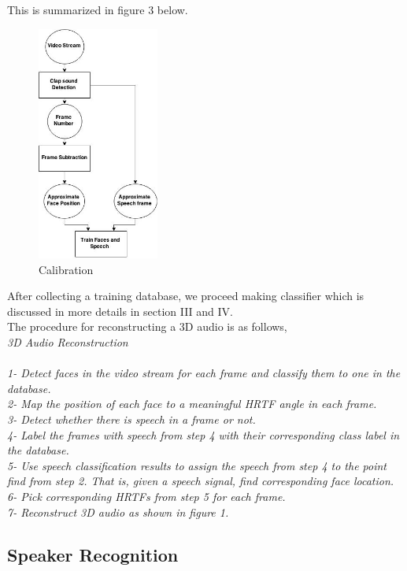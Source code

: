 \documentclass{article}
\begin{document}
This is summarized in figure 3 below. 
\begin{figure}[htb]
\begin{minipage}[b]{0.88\linewidth}
\centering
\centerline{\includegraphics[width=4.0cm]{calibration.jpg}}
\end{minipage}
\caption{Calibration}
\label{fig:res}
\end{figure}
\centerline{}

After collecting a training database, we proceed making classifier which is discussed in more details in section III and IV. \\ The procedure for reconstructing a 3D audio is as follows, \\

{\it 3D Audio Reconstruction \\ \\
1- Detect faces in the video stream for each frame and classify them to one in the database. \\
2- Map the position of each face to a meaningful HRTF angle in each frame. \\ 
3- Detect whether there is speech in a frame or not. \\
4- Label the frames with speech from step 4 with their corresponding class label in the database. \\
5- Use speech classification results to assign the speech from step 4 to the point find from step 2. That is, given a speech signal, find corresponding face location. \\
6- Pick corresponding HRTFs from step 5 for each frame. \\
7- Reconstruct 3D audio as shown in figure 1. }

\subsection{Speaker Recognition}
\end{document}
